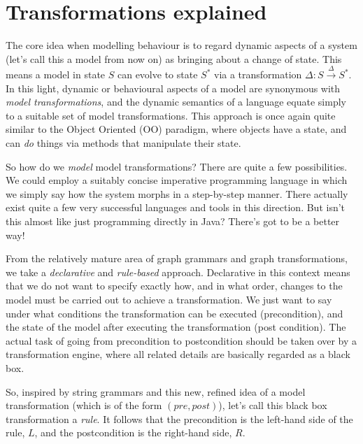 \newpage
\genHeader
\section{Transformations explained}
\hypertarget{explanation}{}

The core idea when modelling behaviour is to regard dynamic aspects of a system (let's call this a model from now on) as bringing about a change of state.
This means a model in state $S$ can evolve to state $S^*$ via a transformation $\Delta: S \stackrel{\Delta}{\rightarrow}S^*$. In this light, dynamic or
behavioural aspects of a model are synonymous with \emph{model transformations}, and the dynamic semantics of a language equate simply to a suitable set of
model transformations. This approach is once again quite similar to the Object Oriented (OO) paradigm, where objects have a state, and can \emph{do} things via
methods that manipulate their state.

So how do we \emph{model} model transformations?  There are quite a few possibilities. We could employ a suitably concise imperative programming language in
which we simply say how the system morphs in a step-by-step manner. There actually exist quite a few very successful languages and tools in this direction. But
isn't this almost like just programming directly in Java? There's got to be a better way! 

From the relatively mature area of graph grammars and graph transformations, we take a \emph{declarative} and \emph{rule-based} approach. Declarative in this
context means that we do not want to specify exactly how, and in what order, changes to the model must be carried out to achieve a transformation. We just want
to say under what conditions the transformation can be executed (precondition), and the state of the model after executing the transformation (post condition).
The actual task of going from precondition to postcondition should be taken over by a transformation engine, where all related details are basically regarded as
a black box.

So, inspired by string grammars and this new, refined idea of a model transformation (which is of the form $(pre, post)$), let's call this black box
transformation a \emph{rule}. It follows that the precondition is the left-hand side of the rule, $L$, and the postcondition is the right-hand side, $R$.

